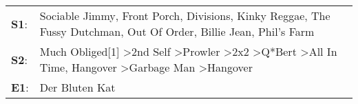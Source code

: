 \begin{supertabular}{p{0.03\textwidth}p{0.92\textwidth}}
 \textbf{S1}:  &                                                                                              Sociable Jimmy\textsuperscript{}, \enspace Front Porch\textsuperscript{}, \enspace Divisions\textsuperscript{}, \enspace Kinky Reggae\textsuperscript{}, \enspace The Fussy Dutchman\textsuperscript{}, \enspace Out Of Order\textsuperscript{}, \enspace Billie Jean\textsuperscript{}, \enspace Phil's Farm\textsuperscript{}  \enspace  \\
 \textbf{S2}:  &  Much Obliged[1]\textsuperscript{} \textgreater \enspace 2nd Self\textsuperscript{} \textgreater \enspace Prowler\textsuperscript{} \textgreater \enspace 2x2\textsuperscript{} \textgreater \enspace Q*Bert\textsuperscript{} \textgreater \enspace All In Time\textsuperscript{}, \enspace Hangover\textsuperscript{} \textgreater \enspace Garbage Man\textsuperscript{} \textgreater \enspace Hangover\textsuperscript{}  \enspace  \\
 \textbf{E1}:  &                                                                                                                                                                                                                                                                                                                                                                                             Der Bluten Kat\textsuperscript{}  \enspace  \\
\end{supertabular}
